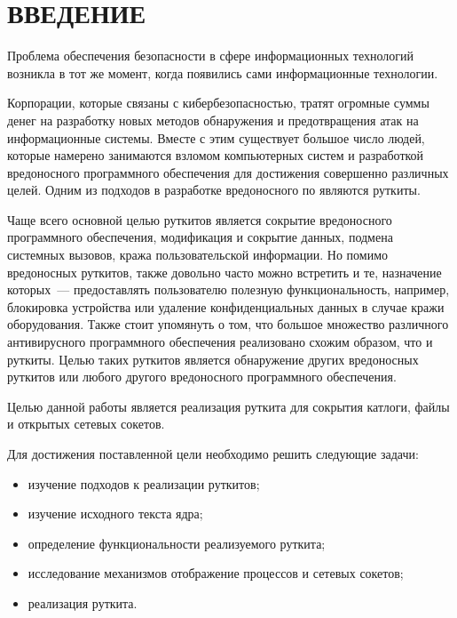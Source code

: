 \chapter*{\hfill{}ВВЕДЕНИЕ\hfill{}}%
\label{cha:vvedenie}

Проблема обеспечения безопасности в сфере информационных технологий возникла в тот же момент, когда появились сами информационные технологии.

Корпорации, которые связаны с кибербезопасностью, тратят огромные суммы денег на разработку новых методов обнаружения и предотвращения атак на информационные системы. Вместе с этим существует большое число людей, которые намерено занимаются взломом компьютерных систем и разработкой вредоносного программного обеспечения для достижения совершенно различных целей. Одним из подходов в разработке вредоносного по являются руткиты.

Чаще всего основной целью руткитов является сокрытие вредоносного программного обеспечения, модификация и сокрытие данных, подмена системных вызовов, кража пользовательской информации. Но помимо вредоносных руткитов, также довольно часто можно встретить и те, назначение которых~--- предоставлять пользователю полезную функциональность, например, блокировка устройства или удаление конфиденциальных данных в случае кражи оборудования. Также стоит упомянуть о том, что большое множество различного антивирусного программного обеспечения реализовано схожим образом, что и руткиты. Целью таких руткитов является обнаружение других вредоносных руткитов или любого другого вредоносного программного обеспечения.

Целью данной работы является реализация руткита для сокрытия катлоги, файлы и открытых сетевых сокетов.

Для достижения поставленной цели необходимо решить следующие задачи:
\begin{itemize}
    \item
        изучение подходов к реализации руткитов;
    \item
        изучение исходного текста ядра;
    \item
        определение функциональности реализуемого руткита;
    \item
        исследование механизмов отображение процессов и сетевых сокетов;
    \item
        реализация руткита.
\end{itemize}